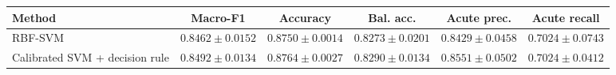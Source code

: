 \begin{tabular}{lccccc}
\toprule
Method & Macro-F1 & Accuracy & Bal. acc. & Acute prec. & Acute recall \\
\midrule
RBF-SVM & $0.8462 \pm 0.0152$ & $0.8750 \pm 0.0014$ & $0.8273 \pm 0.0201$ & $0.8429 \pm 0.0458$ & $0.7024 \pm 0.0743$ \\
Calibrated SVM + decision rule & $0.8492 \pm 0.0134$ & $0.8764 \pm 0.0027$ & $0.8290 \pm 0.0134$ & $0.8551 \pm 0.0502$ & $0.7024 \pm 0.0412$ \\
\bottomrule
\end{tabular}
